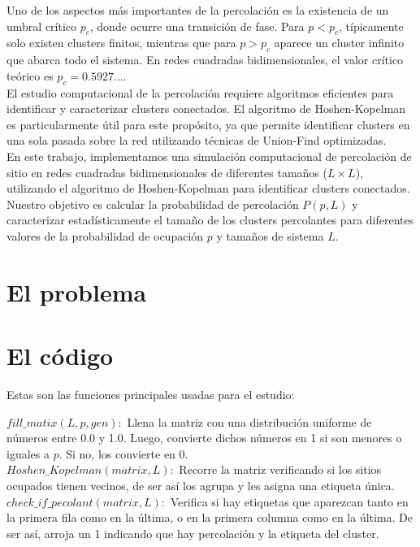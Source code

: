 \documentclass[10pt,twocolumn]{article}
\begin{document}
    Uno de los aspectos más importantes de la percolación es la existencia de un umbral crítico $p_c$, donde ocurre una transición de fase. 
    Para $p < p_c$, típicamente solo existen clusters finitos, mientras que para $p > p_c$ aparece un cluster infinito que abarca todo el 
    sistema. En redes cuadradas bidimensionales, el valor crítico teórico es $p_c = 0.5927...$.\\

    El estudio computacional de la percolación requiere algoritmos eficientes para identificar y caracterizar clusters conectados. El 
    algoritmo de Hoshen-Kopelman \cite{hoshen1976percolation} es particularmente útil para este propósito, ya que permite identificar 
    clusters en una sola pasada sobre la red utilizando técnicas de Union-Find optimizadas.\\

    En este trabajo, implementamos una simulación computacional de percolación de sitio en redes cuadradas bidimensionales de diferentes
    tamaños ($L \times L$), utilizando el algoritmo de Hoshen-Kopelman para identificar clusters conectados. Nuestro objetivo es calcular la 
    probabilidad de percolación $P(p,L)$ y caracterizar estadísticamente el tamaño de los clusters percolantes para diferentes valores de la 
    probabilidad de ocupación $p$ y tamaños de sistema $L$.\\

    
\section{El problema} 
    
\section{El código}
    Estas son las funciones principales usadas para el estudio:

    $fill\_matix(L, p, gen):$ Llena la matriz con una distribución uniforme de números entre 0.0 y 1.0. Luego, convierte
    dichos números en 1 si son menores o iguales a $p$. Si no, los convierte en 0.\\ 

    $Hoshen\_Kopelman(matrix, L):$ Recorre la matriz verificando si los sitios ocupados tienen vecinos, de ser así los agrupa
    y les asigna una etiqueta única.\\

    $check\_if\_pecolant(matrix, L):$ Verifica si hay etiquetas que aparezcan tanto en la primera fila como en la última, o
    en la primera columna como en la última. De ser así, arroja un 1 indicando que hay percolación y la etiqueta del cluster.\\
    
\end{document}

